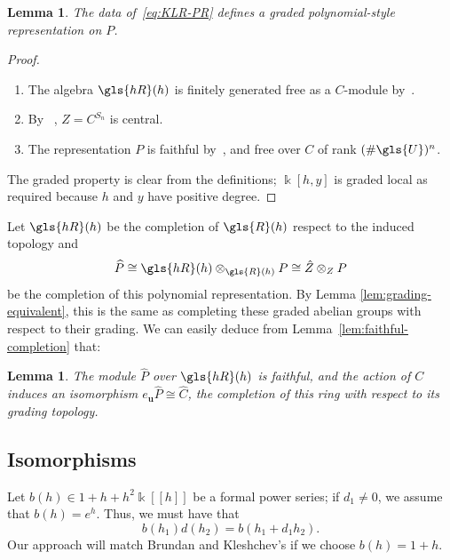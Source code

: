 \documentclass[10pt]{article}
\newtheorem{lemma}[theorem]{Lemma}
\theoremstyle{definition}
\newcommand{\K}{\Bbbk}%
\newcommand{\Bu}{\mathbf{u}}
\newcommand{\hR}{\gls{hR}}
\newcommand{\hP}{\widehat{P}}
\newcommand\llbracket{[\![}
\newcommand\rrbracket{]\!]}
\begin{document}
\begin{lemma}
 The data of~\eqref{eq:KLR-PR} defines a graded polynomial-style
 representation on $P$. 
\end{lemma}
\begin{proof}\mbox{}
 \begin{enumerate}
 \item The algebra $\hR(h)$ is finitely generated free as a
$C$-module by~\cite[Cor.~2.10]{KLI}. 
 \item By
~\cite[Thm.~2.9]{KLI}, $Z=C^{S_n} $ is central.
 \item The representation $P$ is faithful by~\cite[Cor.~2.6]{KLI},
 and free over $C$ of rank $(\# \gls{U})^n$. 
 \end{enumerate}
 The graded property is clear from the definitions; $\K[h,y]$ is
 graded local as required because $h$ and $y$ have positive degree.
 \end{proof}
Let $\hR(h)$ be the completion of $\gls{R}(h)$
respect to the induced topology and \[\hP\cong
\hR(h)\otimes_{\gls{R}(h)}P\cong \hat{Z}\otimes_{Z} P\]
be the completion of this polynomial representation. By Lemma
\ref{lem:grading-equivalent}, this is the same as completing these
graded abelian groups with respect to their grading. We can easily
deduce from Lemma~\ref{lem:faithful-completion} that:
\begin{lemma}\label{lem:KLR-P}
The module $\hP$ over $\hR(h)$ is faithful, and the action of $C$ induces an isomorphism $e_{\Bu}\hP\cong \widehat{C}$, the completion of
this ring with respect to its grading topology. 
\end{lemma}

\subsection{Isomorphisms}
Let $b(h)\in 1+h+h^2\K\llbracket h\rrbracket $ be a formal power series; if $d_1\neq 0$, we
assume that $b(h)=e^h$. Thus, we must have that
\begin{equation}
b(h_1)d(h_2)=b(h_1+d_1h_2). \label{eq:b-d}
\end{equation}
Our approach will match Brundan and Kleshchev's if we choose
$b(h)=1+h$. 
\end{document}
